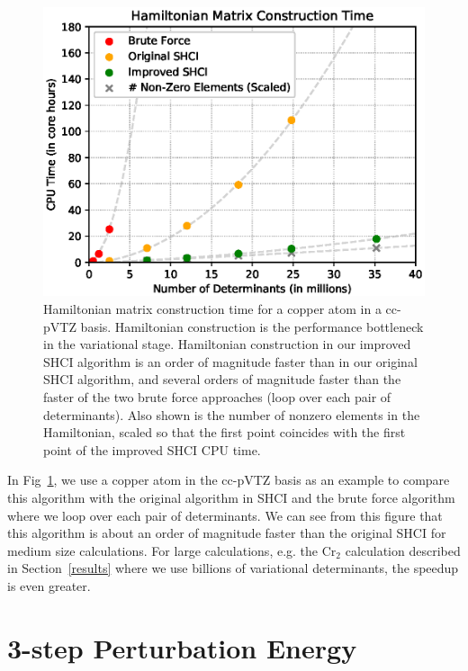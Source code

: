 \documentclass[%
reprint,
 superscriptaddress,
 amsmath,amssymb,
 aps,
]{revtex4-1}
\begin{document}
\begin{figure}
  \includegraphics[width=\linewidth]{speedup/speedup.eps}
  \caption{Hamiltonian matrix construction time for a copper atom in a cc-pVTZ basis. Hamiltonian construction is the performance bottleneck in the variational stage.
Hamiltonian construction in our improved SHCI algorithm is an order of magnitude faster than in
our original SHCI algorithm, and several orders of magnitude faster than the faster of the two brute force
approaches (loop over each pair of determinants).
Also shown is the number of nonzero elements in the Hamiltonian, scaled so that the first point coincides with
the first point of the improved SHCI CPU time.}
  \label{fig:ham}
\end{figure}

In Fig~\ref{fig:ham}, we use a copper atom in the cc-pVTZ basis as an example to compare this algorithm with the original algorithm in SHCI
and the brute force algorithm where we loop over each pair of determinants.
We can see from this figure that this algorithm
is about an order of magnitude faster than the original SHCI for medium size calculations.
For large calculations, e.g. the Cr$_2$ calculation described in Section~\ref{results}
where we use billions of variational determinants, the speedup is even greater.

\section{3-step Perturbation Energy}
\label{multi}
\end{document}
